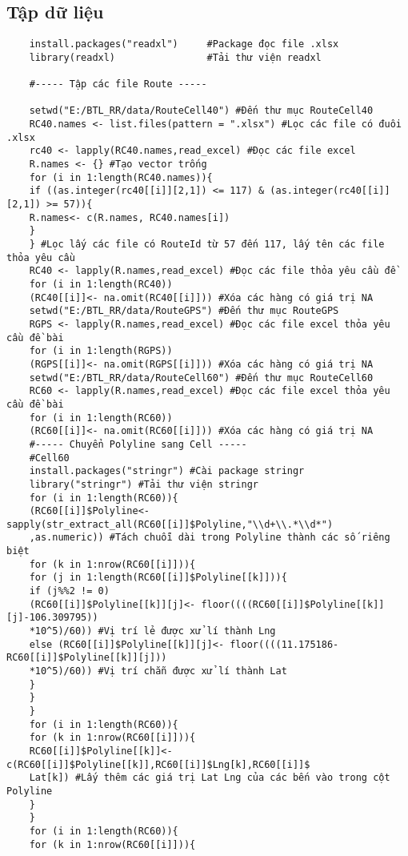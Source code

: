 \documentclass[a4paper]{article}
\begin{document}
	\subsection{Tập dữ liệu} 
	\begin{verbatim}
	install.packages("readxl")     #Package đọc file .xlsx
	library(readxl)                #Tải thư viện readxl
	
	#----- Tập các file Route -----
	
	setwd("E:/BTL_RR/data/RouteCell40") #Đến thư mục RouteCell40
	RC40.names <- list.files(pattern = ".xlsx") #Lọc các file có đuôi .xlsx
	rc40 <- lapply(RC40.names,read_excel) #Đọc các file excel
	R.names <- {} #Tạo vector trống
	for (i in 1:length(RC40.names)){
	if ((as.integer(rc40[[i]][2,1]) <= 117) & (as.integer(rc40[[i]][2,1]) >= 57)){
	R.names<- c(R.names, RC40.names[i])
	}
	} #Lọc lấy các file có RouteId từ 57 đến 117, lấy tên các file thỏa yêu cầu
	RC40 <- lapply(R.names,read_excel) #Đọc các file thỏa yêu cầu đề
	for (i in 1:length(RC40))
	(RC40[[i]]<- na.omit(RC40[[i]])) #Xóa các hàng có giá trị NA
	setwd("E:/BTL_RR/data/RouteGPS") #Đến thư mục RouteGPS
	RGPS <- lapply(R.names,read_excel) #Đọc các file excel thỏa yêu cầu đề bài
	for (i in 1:length(RGPS))
	(RGPS[[i]]<- na.omit(RGPS[[i]])) #Xóa các hàng có giá trị NA
	setwd("E:/BTL_RR/data/RouteCell60") #Đến thư mục RouteCell60
	RC60 <- lapply(R.names,read_excel) #Đọc các file excel thỏa yêu cầu đề bài
	for (i in 1:length(RC60))
	(RC60[[i]]<- na.omit(RC60[[i]])) #Xóa các hàng có giá trị NA
	#----- Chuyển Polyline sang Cell -----
	#Cell60
	install.packages("stringr") #Cài package stringr
	library("stringr") #Tải thư viện stringr
	for (i in 1:length(RC60)){
	(RC60[[i]]$Polyline<-sapply(str_extract_all(RC60[[i]]$Polyline,"\\d+\\.*\\d*")
	,as.numeric)) #Tách chuỗi dài trong Polyline thành các số riêng biệt
	for (k in 1:nrow(RC60[[i]])){
	for (j in 1:length(RC60[[i]]$Polyline[[k]])){
	if (j%%2 != 0)
	(RC60[[i]]$Polyline[[k]][j]<- floor((((RC60[[i]]$Polyline[[k]][j]-106.309795))
	*10^5)/60)) #Vị trí lẻ được xử lí thành Lng
	else (RC60[[i]]$Polyline[[k]][j]<- floor((((11.175186-RC60[[i]]$Polyline[[k]][j]))
	*10^5)/60)) #Vị trí chẵn được xử lí thành Lat
	}
	}
	}
	for (i in 1:length(RC60)){
	for (k in 1:nrow(RC60[[i]])){
	RC60[[i]]$Polyline[[k]]<-c(RC60[[i]]$Polyline[[k]],RC60[[i]]$Lng[k],RC60[[i]]$
	Lat[k]) #Lấy thêm các giá trị Lat Lng của các bến vào trong cột Polyline
	}
	}
	for (i in 1:length(RC60)){
	for (k in 1:nrow(RC60[[i]])){

\end{verbatim}
\end{document}
